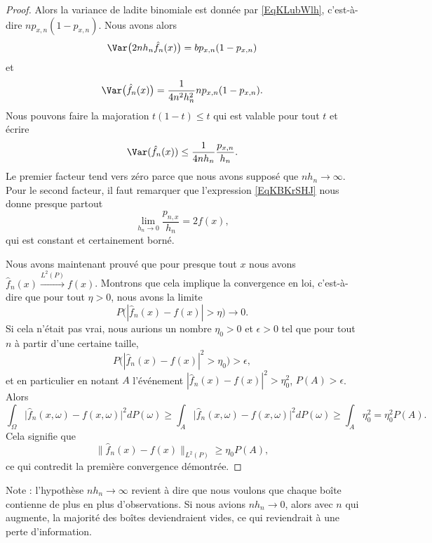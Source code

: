 \begin{proof}
    Alors la variance de ladite binomiale est donnée par \eqref{EqKLubWlh}, c'est-à-dire \( np_{x,n}(1-p_{x,n})\). Nous avons alors
    \begin{equation}
         \Var\big( 2nh_n\hat f_n(x) \big)=bp_{x,n}(1-p_{x,n})
    \end{equation}
    et
    \begin{equation}
        \Var\big( \hat f_n(x) \big)=\frac{1}{ 4n^2h_n^2 }np_{x,n}(1-p_{x,n}).
    \end{equation}
    Nous pouvons faire la majoration \( t(1-t)\leq t\) qui est valable pour tout \( t\) et écrire
    \begin{equation}
        \Var(\hat f_n(x))\leq \frac{1}{ 4nh_n }\frac{ p_{x,n} }{ h_n }.
    \end{equation}
    Le premier facteur tend vers zéro parce que nous avons supposé que \( nh_n\to \infty\). Pour le second facteur, il faut remarquer que l'expression \eqref{EqKBKrSHJ} nous donne presque partout
    \begin{equation}
        \lim_{h_n\to 0} \frac{ p_{n,x} }{ h_n }=2f(x),
    \end{equation}
    qui est constant et certainement borné.

    Nous avons maintenant prouvé que pour presque tout \( x\) nous avons \( \hat f_n(x)\stackrel{L^2(P)}{\to}f(x)\). Montrons que cela implique la convergence en loi, c'est-à-dire que pour tout \( \eta>0\), nous avons la limite
    \begin{equation}
        P\big( | \hat f_n(x)-f(x) |>\eta \big)\to 0.
    \end{equation}
    Si cela n'était pas vrai, nous aurions un nombre \( \eta_0>0\) et \( \epsilon>0\) tel que pour tout \( n\) à partir d'une certaine taille,
    \begin{equation}
        P\Big( | \hat f_n(x)-f(x) |^2>\eta_0 \Big)>\epsilon,
    \end{equation}
    et en particulier en notant \( A\) l'événement \( | \hat f_n(x)-f(x) |^2>\eta_0^2\), \( P(A)>\epsilon\). Alors
    \begin{equation}
        \int_{\Omega}\big| \hat f_n(x,\omega)-f(x,\omega) \big|^2dP(\omega)\geq \int_A\big| \hat f_n(x,\omega)-f(x,\omega) \big|^2dP(\omega)\geq\int_A\eta_0^2=\eta_0^2P(A).
    \end{equation}
    Cela signifie que
    \begin{equation}
        \| \hat f_n(x)-f(x) \|_{L^2(P)}\geq \eta_0P(A),
    \end{equation}
    ce qui contredit la première convergence démontrée.
\end{proof}
Note : l'hypothèse \( nh_n\to\infty\) revient à dire que nous voulons que chaque boîte contienne de plus en plus d'observations. Si nous avions \( nh_n\to 0\), alors avec \( n\) qui augmente, la majorité des boîtes deviendraient vides, ce qui reviendrait à une perte d'information.

